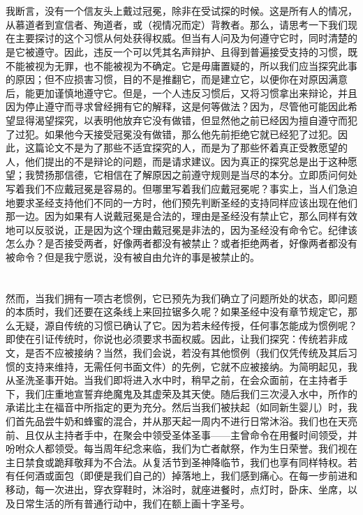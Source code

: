 
\section{}

我断言，没有一个信友头上戴过冠冕，除非在受试探的时候。这是所有人的情况，从慕道者到宣信者、殉道者，或（视情况而定）背教者。那么，请思考一下我们现在主要探讨的这个习惯从何处获得权威。但当有人问及为何遵守它时，同时清楚的是它被遵守。因此，违反一个可以凭其名声辩护、且得到普遍接受支持的习惯，既不能被视为无罪，也不能被视为不确定。它是毋庸置疑的，所以我们应当探究此事的原因；但不应损害习惯，目的不是推翻它，而是建立它，以便你在对原因满意后，能更加谨慎地遵守它。但是，一个人违反习惯后，又将习惯拿出来辩论，并且因为停止遵守而寻求曾经拥有它的解释，这是何等做法？因为，尽管他可能因此希望显得渴望探究，以表明他放弃它没有做错，但显然他之前已经因为擅自遵守而犯了过犯。如果他今天接受冠冕没有做错，那么他先前拒绝它就已经犯了过犯。因此，这篇论文不是为了那些不适宜探究的人，而是为了那些怀着真正受教愿望的人，他们提出的不是辩论的问题，而是请求建议。因为真正的探究总是出于这种愿望；我赞扬那信德，它相信在了解原因之前遵守规则是当尽的本分。立即质问何处写着我们不应戴冠冕是容易的。但哪里写着我们应戴冠冕呢？事实上，当人们急迫地要求圣经支持他们不同的一方时，他们预先判断圣经的支持同样应该出现在他们那一边。因为如果有人说戴冠冕是合法的，理由是圣经没有禁止它，那么同样有效地可以反驳说，正是因为这个理由戴冠冕是非法的，因为圣经没有命令它。纪律该怎么办？是否接受两者，好像两者都没有被禁止？或者拒绝两者，好像两者都没有被命令？但是我宁愿说，没有被自由允许的事是被禁止的。\par


\section{}

然而，当我们拥有一项古老惯例，它已预先为我们确立了问题所处的状态，即问题的本质时，我们还要在这条线上来回拉锯多久呢？如果圣经中没有章节规定它，那么无疑，源自传统的习惯已确认了它。因为若未经传授，任何事怎能成为惯例呢？即使在引证传统时，你说也必须要求书面权威。因此，让我们探究：传统若非成文，是否不应被接纳？当然，我们会说，若没有其他惯例（我们仅凭传统及其后习惯的支持来维持，无需任何书面文件）的先例，它就不应被接纳。为简明起见，我从圣洗圣事开始。当我们即将进入水中时，稍早之前，在会众面前，在主持者手下，我们庄重地宣誓弃绝魔鬼及其虚荣及其天使。随后我们三次浸入水中，所作的承诺比主在福音中所指定的更为充分。然后当我们被扶起（如同新生婴儿）时，我们首先品尝牛奶和蜂蜜的混合，并从那天起一周内不进行日常沐浴。我们也在天亮前、且仅从主持者手中，在聚会中领受圣体圣事——主曾命令在用餐时间领受，并吩咐众人都领受。每当周年纪念来临，我们为亡者献祭，作为生日荣誉。我们视在主日禁食或跪拜敬拜为不合法。从复活节到圣神降临节，我们也享有同样特权。若有任何酒或面包（即便是我们自己的）掉落地上，我们感到痛心。在每一步前进和移动，每一次进出，穿衣穿鞋时，沐浴时，就座进餐时，点灯时，卧床、坐席，以及日常生活的所有普通行动中，我们在额上画十字圣号。\par

